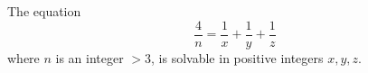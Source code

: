 \begin{conjecture}
    The equation
\[
    \frac{4}{n}=\frac{1}{x}+\frac{1}{y}+\frac{1}{z}
\]
    where $n$ is an integer $>3$, is solvable in positive integers $x,y,z$.
\end{conjecture}
